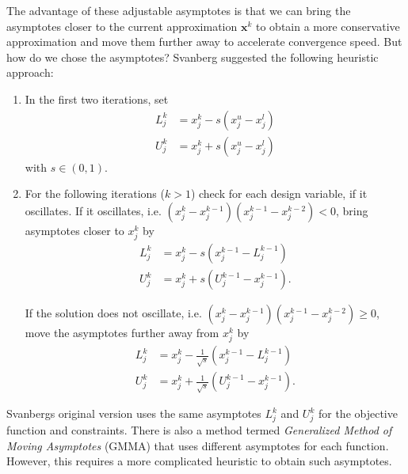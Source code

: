 The advantage of these adjustable asymptotes is that we can bring the asymptotes closer to the current approximation $\mathbf{x}^k$ to obtain a more conservative approximation and move them further away to accelerate convergence speed. But how do we chose the asymptotes? Svanberg \cite{Svanberg1987} suggested the following heuristic approach: 
\begin{enumerate}
    \item In the first two iterations, set 
        \begin{align}
            L_j^k &= x_j^k - s (x^u_j - x^l_j) \\
            U^k_j &= x_j^k + s (x^u_j - x^l_j)
        \end{align}
    with $s \in (0,1)$.
    \item For the following iterations ($k>1$) check for each design variable, if it oscillates. If it oscillates, i.e. $(x_j^k-x_j^{k-1})(x_j^{k-1}-x_j^{k-2}) < 0$, bring asymptotes closer to $x_j^k$ by   
        \begin{align}            
            \label{eq:mma_heuristic_first}
            L_j^k &= x_j^k - s (x_j^{k-1} - L_j^{k-1}) \\
            U_j^k &= x_j^k + s (U_j^{k-1} - x_j^{k-1}).
        \end{align}

    If the solution does not oscillate, i.e. $(x_j^k-x_j^{k-1})(x_j^{k-1}-x_j^{k-2}) \ge 0$, move the asymptotes further away from $x_j^k$ by   
        \begin{align}
            L_j^k &= x_j^k - \frac{1}{\sqrt{s}} (x_j^{k-1} - L_j^{k-1}) \\
            U_j^k &= x_j^k + \frac{1}{\sqrt{s}} (U_j^{k-1} - x_j^{k-1}).
            \label{eq:mma_heuristic_last}
        \end{align}
\end{enumerate}

Svanbergs original version uses the same asymptotes $L_j^k$ and $U_j^k$ for the objective function and constraints. There is also a method termed \emph{Generalized Method of Moving Asymptotes} (GMMA) \cite{Zhang1997} that uses different asymptotes for each function. However, this requires a more complicated heuristic to obtain such asymptotes.

